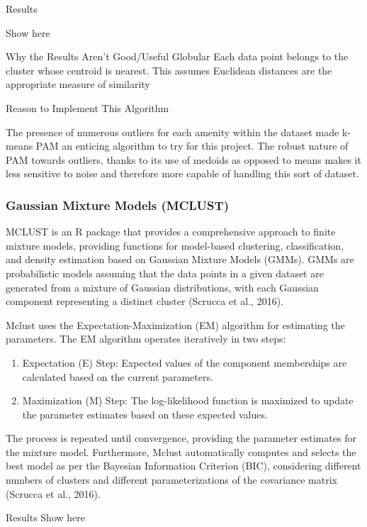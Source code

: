 \documentclass[11pt, a4paper]{article}
\begin{document}
Results

Show here

Why the Results Aren't Good/Useful
Globular 
Each data point belongs to the cluster whose centroid is nearest. This assumes Euclidean distances are the appropriate measure of similarity



Reason to Implement This Algorithm

The presence of numerous outliers for each amenity within the dataset made k-means PAM an enticing algorithm to try for this project. The robust nature of PAM towards outliers, thanks to its use of medoids as opposed to means makes it less sensitive to noise and therefore more capable of handling this sort of dataset. 





\subsubsection{Gaussian Mixture Models (MCLUST)} 

MCLUST is an R package that provides a comprehensive approach to finite mixture models, providing functions for model-based clustering, classification, and density estimation based on Gaussian Mixture Models (GMMs). GMMs are probabilistic models assuming that the data points in a given dataset are generated from a mixture of Gaussian distributions, with each Gaussian component representing a distinct cluster (Scrucca et al., 2016).
\par
Mclust uses the Expectation-Maximization (EM) algorithm for estimating the parameters. The EM algorithm operates iteratively in two steps:
\begin{enumerate}
\item Expectation (E) Step: Expected values of the component memberships are calculated based on the current parameters.
\item Maximization (M) Step: The log-likelihood function is maximized to update the parameter estimates based on these expected values.
\end{enumerate}
The process is repeated until convergence, providing the parameter estimates for the mixture model. Furthermore, Mclust automatically computes and selects the best model as per the Bayesian Information Criterion (BIC), considering different numbers of clusters and different parameterizations of the covariance matrix (Scrucca et al., 2016).


Results
Show here
\end{document}

